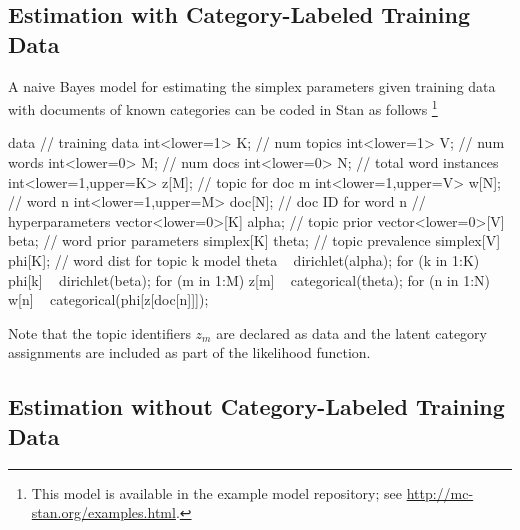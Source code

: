\subsection{Estimation with Category-Labeled Training Data}


A naive Bayes model for estimating the simplex parameters given
training data with documents of known categories can be coded in Stan
as follows%
%
\footnote{This model is available in the example model repository;
  see \url{http://mc-stan.org/examples.html}.}
%
\begin{stancode}
data {
  // training data
  int<lower=1> K;               // num topics
  int<lower=1> V;               // num words
  int<lower=0> M;               // num docs
  int<lower=0> N;               // total word instances
  int<lower=1,upper=K> z[M];    // topic for doc m
  int<lower=1,upper=V> w[N];    // word n
  int<lower=1,upper=M> doc[N];  // doc ID for word n
  // hyperparameters
  vector<lower=0>[K] alpha;     // topic prior
  vector<lower=0>[V] beta;      // word prior
}
parameters {
  simplex[K] theta;   // topic prevalence
  simplex[V] phi[K];  // word dist for topic k
}
model {
  theta ~ dirichlet(alpha);
  for (k in 1:K)  
    phi[k] ~ dirichlet(beta);
  for (m in 1:M)
    z[m] ~ categorical(theta);
  for (n in 1:N)
    w[n] ~ categorical(phi[z[doc[n]]]);
}
\end{stancode}
%
Note that the topic identifiers $z_m$ are declared as data and the
latent category assignments are included as part of the likelihood
function.  

\subsection{Estimation without Category-Labeled Training Data}


